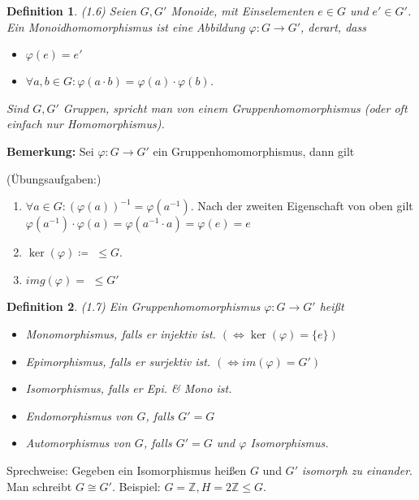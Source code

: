 \documentclass[10pt,a4paper]{article}
\newtheorem{defi}{Definition}
\begin{document}
\begin{defi} (1.6) Seien $G, G'$ Monoide, mit Einselementen $e \in G$ und $e' \in G'$. Ein \emph{Monoidhomomorphismus} ist eine Abbildung $\varphi : G \to G'$, derart, dass \begin{itemize}
\item $\varphi(e) = e'$
\item $\forall a, b \in G: \varphi(a \cdot b) = \varphi (a) \cdot \varphi (b)$.
\end{itemize}
Sind $G, G'$ Gruppen, spricht man von einem \emph{Gruppenhomomorphismus} (oder oft einfach nur Homomorphismus).
\end{defi}

\textbf{Bemerkung:} Sei $\varphi : G \to G'$ ein Gruppenhomomorphismus, dann gilt

(Übungsaufgaben:)
\begin{enumerate}
\item $\forall a \in G: (\varphi (a))^{-1} = \varphi (a^{-1})$. Nach der zweiten Eigenschaft von oben gilt $\varphi(a^{-1}) \cdot \varphi(a) = \varphi(a^{-1} \cdot a) = \varphi(e) = e$

\item $\ker (\varphi) \coloneqq$  $\leqslant G$.

\item $img (\varphi) =$    $\leqslant G'$
\end{enumerate} 

\begin{defi} (1.7) Ein Gruppenhomomorphismus $\varphi : G \to G'$ heißt
\begin{itemize}
	\item \emph{Monomorphismus}, falls er injektiv ist. $(\Leftrightarrow \ker (\varphi) = \{e\})$
	\item \emph{Epimorphismus}, falls er surjektiv ist. $(\Leftrightarrow im(\varphi) = G')$
	\item \emph{Isomorphismus}, falls er Epi. \& Mono ist.
	\item \emph{Endomorphismus} von $G$, falls $G' = G$
	\item \emph{Automorphismus} von $G$, falls $G' = G$ und $\varphi$ Isomorphismus.
\end{itemize}
\end{defi}

Sprechweise: Gegeben ein Isomorphismus heißen $G$ und $G'$ \emph{isomorph zu einander}. Man schreibt $G \cong G'$. Beispiel: $G = \mathbb{Z}, H = 2 \mathbb{Z} \leqslant G$.
\end{document}
